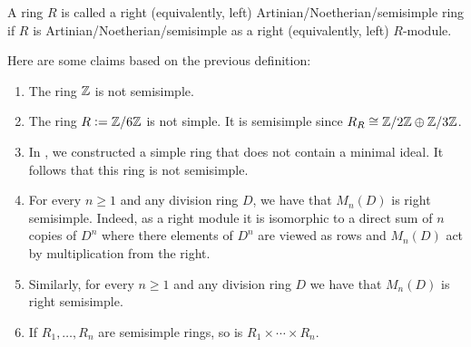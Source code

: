 \documentclass[11pt,a4paper]{article}
\begin{document}
\begin{definition}
  A ring $R$ is called a right (equivalently, left)
  Artinian/Noetherian/semisimple ring if
  $R$ is Artinian/Noetherian/semisimple as a right (equivalently, left)
  $R$-module.
\end{definition}

\begin{example}
  Here are some claims based on the previous definition:
  \begin{enumerate}
    \item[(1)] The ring $\mathbb{Z}$ is not semisimple.
    \item[(2)] The ring $R := \mathbb{Z}/6\mathbb{Z}$ is not simple.
      It is semisimple since $R_R \cong \mathbb{Z}/2\mathbb{Z} \oplus \mathbb{Z}/3\mathbb{Z}$.
    \item[(3)] In ,
      we constructed a simple ring
      that does not contain a minimal ideal.
      It follows that this ring is not semisimple.
    \item[(4)] For every $n \geq 1$ and any division ring $D$,
      we have that $M_n(D)$ is right semisimple.
      Indeed, as a right module it is isomorphic to a direct sum of $n$
      copies of $D^n$ where there elements of $D^n$ are viewed as rows
      and $M_n(D)$ act by multiplication from the right.
    \item[(5)] Similarly, for every $n \geq 1$ and any division ring
      $D$ we have that $M_n(D)$ is right semisimple.
    \item[(6)] If $R_1,\dots,R_n$ are semisimple rings,
      so is $R_1 \times \cdots \times R_n$. %
  \end{enumerate}
\end{example}
\end{document}
